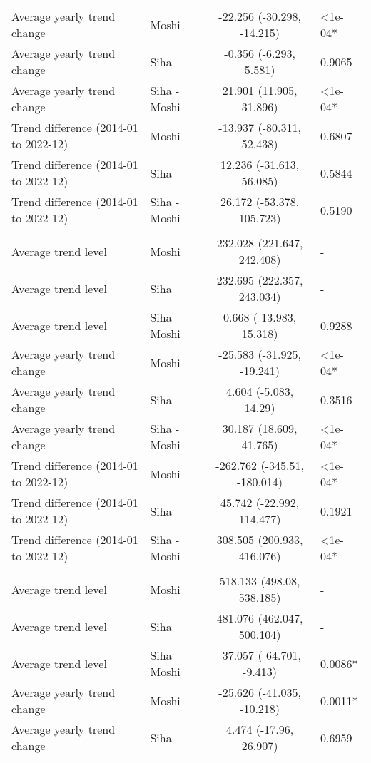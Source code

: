 \begin{longtable}{l|lcl}
Average yearly trend change & Moshi & -22.256 (-30.298, -14.215) & <1e-04* \\ 
Average yearly trend change & Siha & -0.356 (-6.293, 5.581) & 0.9065 \\ 
Average yearly trend change & Siha - Moshi & 21.901 (11.905, 31.896) & <1e-04* \\ 
Trend difference (2014-01 to 2022-12) & Moshi & -13.937 (-80.311, 52.438) & 0.6807 \\ 
Trend difference (2014-01 to 2022-12) & Siha & 12.236 (-31.613, 56.085) & 0.5844 \\ 
Trend difference (2014-01 to 2022-12) & Siha - Moshi & 26.172 (-53.378, 105.723) & 0.5190 \\ 
\midrule\addlinespace[2.5pt]
\multicolumn{4}{l}{Other Communicable Diseases} \\[2.5pt] 
\midrule\addlinespace[2.5pt]
Average trend level & Moshi & 232.028 (221.647, 242.408) & - \\ 
Average trend level & Siha & 232.695 (222.357, 243.034) & - \\ 
Average trend level & Siha - Moshi & 0.668 (-13.983, 15.318) & 0.9288 \\ 
Average yearly trend change & Moshi & -25.583 (-31.925, -19.241) & <1e-04* \\ 
Average yearly trend change & Siha & 4.604 (-5.083, 14.29) & 0.3516 \\ 
Average yearly trend change & Siha - Moshi & 30.187 (18.609, 41.765) & <1e-04* \\ 
Trend difference (2014-01 to 2022-12) & Moshi & -262.762 (-345.51, -180.014) & <1e-04* \\ 
Trend difference (2014-01 to 2022-12) & Siha & 45.742 (-22.992, 114.477) & 0.1921 \\ 
Trend difference (2014-01 to 2022-12) & Siha - Moshi & 308.505 (200.933, 416.076) & <1e-04* \\ 
\midrule\addlinespace[2.5pt]
\multicolumn{4}{l}{Other Non-Communicable} \\[2.5pt] 
\midrule\addlinespace[2.5pt]
Average trend level & Moshi & 518.133 (498.08, 538.185) & - \\ 
Average trend level & Siha & 481.076 (462.047, 500.104) & - \\ 
Average trend level & Siha - Moshi & -37.057 (-64.701, -9.413) & 0.0086* \\ 
Average yearly trend change & Moshi & -25.626 (-41.035, -10.218) & 0.0011* \\ 
Average yearly trend change & Siha & 4.474 (-17.96, 26.907) & 0.6959 \\ 

\end{longtable}
